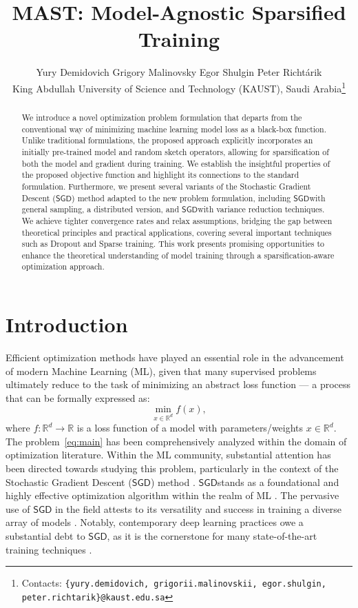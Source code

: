 \documentclass{article}
\title{MAST: Model-Agnostic Sparsified Training}
\author{Yury Demidovich \quad Grigory Malinovsky \quad Egor Shulgin \quad Peter Richt\'{a}rik \\
King Abdullah University of Science and Technology (KAUST), Saudi Arabia\thanks{\tiny Contacts: \texttt{\{yury.demidovich, grigorii.malinovskii, egor.shulgin, peter.richtarik\}@kaust.edu.sa}}  \\
}
\newcommand{\SGD}{$\mathsf{SGD}$}
\newcommand{\bb}{\mathbb}
\newcommand{\R}{\bb R}
\theoremstyle{plain}
\theoremstyle{plain}
\theoremstyle{definition}
\theoremstyle{remark}
\begin{document}
\maketitle

\begin{abstract}
 We introduce a novel optimization problem formulation that departs from the conventional way of minimizing machine learning model loss as a black-box function. Unlike traditional formulations, the proposed approach explicitly incorporates an initially pre-trained model and random sketch operators, allowing for sparsification of both the model and gradient during training. We establish the insightful properties of the proposed objective function and highlight its connections to the standard formulation. Furthermore, we present several variants of the Stochastic Gradient Descent (\SGD) method adapted to the new problem formulation, including \SGD\text{ }with general sampling, a distributed version, and \SGD\text{ }with variance reduction techniques. We achieve tighter convergence rates and relax assumptions, bridging the gap between theoretical principles and practical applications, covering several important techniques such as Dropout and Sparse training. This work presents promising opportunities to enhance the theoretical understanding of model training through a sparsification-aware optimization approach.
\end{abstract}

\section{Introduction}\label{sec:introduction}

Efficient optimization methods have played an essential role in the advancement of modern Machine Learning (ML), given that many supervised problems ultimately reduce to the task of minimizing an abstract loss function --- a process that can be formally expressed as:
\begin{equation} \label{eq:main}
	\min_{x\in \R^d} f(x),
\end{equation}
where $f:\R^d\to \R$ is a loss function of a model with parameters/weights $x \in \R^d$. The problem~\eqref{eq:main} has been comprehensively analyzed within the domain of optimization literature. Within the ML community, substantial attention has been directed towards studying this problem, particularly in the context of the Stochastic Gradient Descent (\SGD) method \citep{robbins1951stochastic}. \SGD\text{ }stands as a foundational and highly effective optimization algorithm within the realm of ML \citep{bottou2018optimization}.
The pervasive use of \SGD\text{ } in the field attests to its versatility and success in training a diverse array of models \citep{goodfellow2016deep}. Notably, contemporary deep learning practices owe a substantial debt to \SGD, as it is the cornerstone for many state-of-the-art training techniques \citep{sun2020optimization}.
\end{document}
